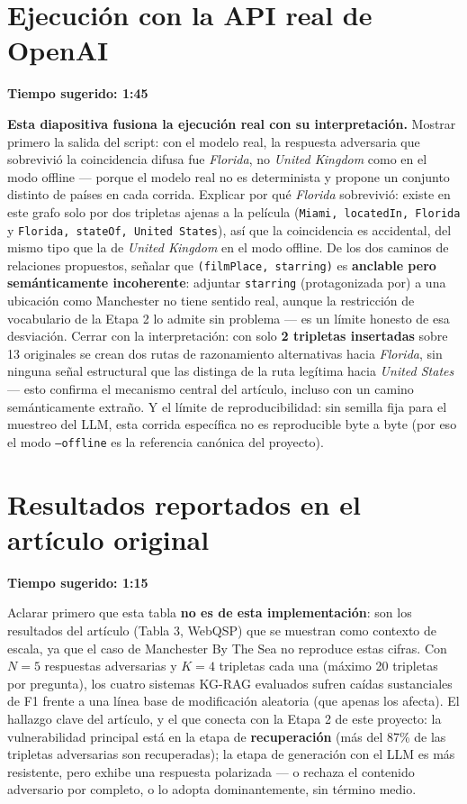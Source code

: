 \documentclass[11pt]{article}
\newcommand{\tiempo}[1]{{\small\color{timecolor}\textbf{Tiempo sugerido: #1}}\par\vspace{0.3em}}
\begin{document}
\section{Ejecución con la API real de OpenAI}
\tiempo{1:45}
\textbf{Esta diapositiva fusiona la ejecución real con su interpretación.} Mostrar primero
la salida del script: con el modelo real, la respuesta adversaria que sobrevivió la
coincidencia difusa fue \emph{Florida}, no \emph{United Kingdom} como en el modo offline
--- porque el modelo real no es determinista y propone un conjunto distinto de países en
cada corrida. Explicar por qué \emph{Florida} sobrevivió: existe en este grafo solo por dos
tripletas ajenas a la película (\texttt{Miami, locatedIn, Florida} y
\texttt{Florida, stateOf, United States}), así que la coincidencia es accidental, del mismo
tipo que la de \emph{United Kingdom} en el modo offline. De los dos caminos de relaciones
propuestos, señalar que \texttt{(filmPlace, starring)} es \textbf{anclable pero
semánticamente incoherente}: adjuntar \texttt{starring} (protagonizada por) a una ubicación
como Manchester no tiene sentido real, aunque la restricción de vocabulario de la Etapa 2 lo
admite sin problema --- es un límite honesto de esa desviación. Cerrar con la
interpretación: con solo \textbf{2 tripletas insertadas} sobre 13 originales se crean dos
rutas de razonamiento alternativas hacia \emph{Florida}, sin ninguna señal estructural que
las distinga de la ruta legítima hacia \emph{United States} --- esto confirma el mecanismo
central del artículo, incluso con un camino semánticamente extraño. Y el límite de
reproducibilidad: sin semilla fija para el muestreo del LLM, esta corrida específica no es
reproducible byte a byte (por eso el modo \texttt{--offline} es la referencia canónica del
proyecto).

\section{Resultados reportados en el artículo original}
\tiempo{1:15}
Aclarar primero que esta tabla \textbf{no es de esta implementación}: son los resultados
del artículo (Tabla 3, WebQSP) que se muestran como contexto de escala, ya que el caso de
Manchester By The Sea no reproduce estas cifras. Con $N=5$ respuestas adversarias y $K=4$
tripletas cada una (máximo 20 tripletas por pregunta), los cuatro sistemas KG-RAG evaluados
sufren caídas sustanciales de F1 frente a una línea base de modificación aleatoria (que
apenas los afecta). El hallazgo clave del artículo, y el que conecta con la Etapa 2 de este
proyecto: la vulnerabilidad principal está en la etapa de \textbf{recuperación} (más del
87\% de las tripletas adversarias son recuperadas); la etapa de generación con el LLM es
más resistente, pero exhibe una respuesta polarizada --- o rechaza el contenido adversario
por completo, o lo adopta dominantemente, sin término medio.
\end{document}
